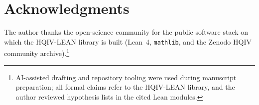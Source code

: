 \documentclass[11pt]{amsart}
\begin{document}
\section*{Acknowledgments}
The author thanks the open-science community for the public
software stack on which the HQIV-LEAN library is built (Lean~4,
\texttt{mathlib}, and the Zenodo HQIV community
archive).\footnote{AI-assisted drafting and repository tooling
were used during manuscript preparation; all formal claims refer
to the HQIV-LEAN library, and the author reviewed hypothesis
lists in the cited Lean modules.}



\end{document}
